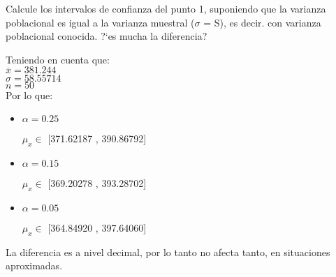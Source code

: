 Calcule los intervalos de confianza del punto 1, suponiendo que la varianza poblacional es igual a la
varianza muestral ($\sigma$ = S), es decir. con varianza poblacional conocida. ?`es mucha la diferencia?

Teniendo en cuenta que: \\

$\overline{x} = 381.244$\\
$\widehat{\sigma} = 58.55714$\\
$n = 50$\\

Por lo que: \\

\begin{itemize}

\item $\alpha = 0.25$

$\mu_x \in$ [371.62187 , 390.86792]

\item $\alpha = 0.15$

$\mu_x \in$ [369.20278 , 393.28702]

\item $\alpha = 0.05$

$\mu_x \in$ [364.84920 , 397.64060]

\end{itemize}


La diferencia es a nivel decimal, por lo tanto no afecta tanto, en situaciones aproximadas.
